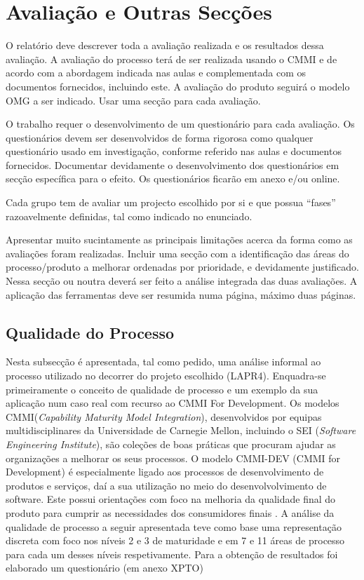 \documentclass[openany,10pt,a4paper]{article}
\begin{document}
\section{Avaliação e Outras Secções}
O relatório deve descrever toda a avaliação realizada e os resultados dessa avaliação. A avaliação do processo terá de ser realizada usando o CMMI e de acordo com a abordagem indicada nas aulas e complementada com os documentos fornecidos, incluindo este. A avaliação do produto seguirá o modelo OMG a ser indicado. Usar uma secção para cada avaliação.

O trabalho requer o desenvolvimento de um questionário para cada avaliação. Os questionários devem ser desenvolvidos de forma rigorosa como qualquer questionário usado em investigação, conforme referido nas aulas e documentos fornecidos. Documentar devidamente o desenvolvimento dos questionários em secção específica para o efeito. Os questionários ficarão em anexo e/ou online.

Cada grupo tem de avaliar um projecto escolhido por si e que possua “fases” razoavelmente definidas, tal como indicado no enunciado.

Apresentar muito sucintamente as principais limitações acerca da forma como as avaliações foram realizadas. Incluir uma secção com a identificação das áreas do processo/produto a melhorar ordenadas por prioridade, e devidamente justificado. Nessa secção ou noutra deverá ser feito a análise integrada das duas avaliações. A aplicação das ferramentas deve ser resumida numa página, máximo duas páginas.

\subsection{Qualidade do Processo}
Nesta subsecção é apresentada, tal como pedido, uma análise informal ao processo utilizado no decorrer do projeto escolhido (LAPR4). Enquadra-se primeiramente o conceito de qualidade de processo e um exemplo da sua aplicação num caso real com recurso ao CMMI For Development.
Os modelos CMMI(\textit{Capability Maturity Model Integration}), desenvolvidos por equipas multidisciplinares da Universidade de Carnegie Mellon, incluindo o SEI (\textit{Software Engineering Institute}), são coleções de boas práticas que procuram ajudar as organizações a melhorar os seus processos. O modelo CMMI-DEV (CMMI for Development) é especialmente ligado aos processos de desenvolvimento de produtos e serviços, daí a sua utilização no meio do desenvolvolvimento de software. Este possui orientações com foco na melhoria da qualidade final do produto para cumprir as necessidades dos consumidores finais \cite{CMMIProductTeam2010}.
A análise da qualidade de processo a seguir apresentada teve como base uma representação discreta com foco nos níveis 2 e 3 de maturidade e em 7 e 11 áreas de processo para cada um desses níveis respetivamente. Para a obtenção de resultados foi elaborado um questionário (em anexo XPTO) 
\end{document}
